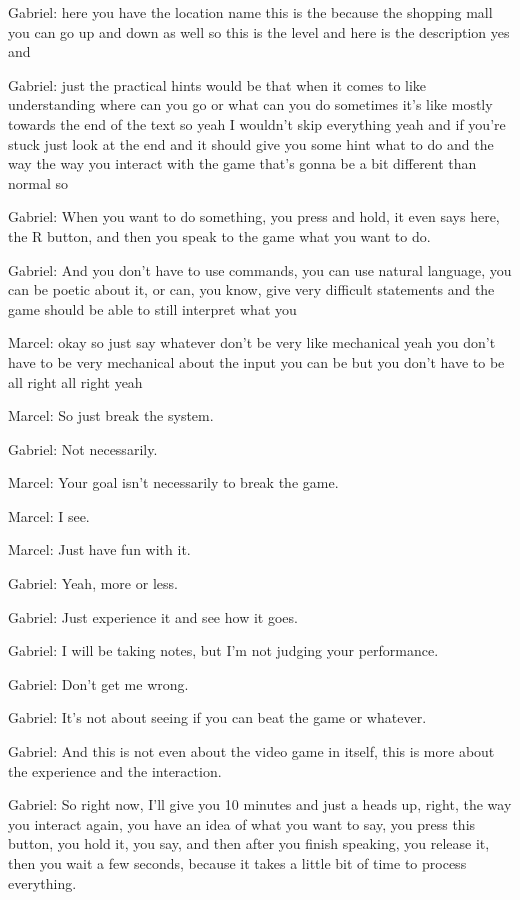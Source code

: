 Gabriel: here you have the location name this is the because the shopping mall you can go up and down as well so this is the level and here is the description yes and

Gabriel: just the practical hints would be that when it comes to like understanding where can you go or what can you do sometimes it's like mostly towards the end of the text so yeah I wouldn't skip everything yeah and if you're stuck just look at the end and it should give you some hint what to do and the way the way you interact with the game that's gonna be a bit different than normal so

Gabriel: When you want to do something, you press and hold, it even says here, the R button, and then you speak to the game what you want to do.

Gabriel: And you don't have to use commands, you can use natural language, you can be poetic about it, or can, you know, give very difficult statements and the game should be able to still interpret what you

Marcel: okay so just say whatever don't be very like mechanical yeah you don't have to be very mechanical about the input you can be but you don't have to be all right all right yeah

Marcel: So just break the system.

Gabriel: Not necessarily.

Marcel: Your goal isn't necessarily to break the game.

Marcel: I see.

Marcel: Just have fun with it.

Gabriel: Yeah, more or less.

Gabriel: Just experience it and see how it goes.

Gabriel: I will be taking notes, but I'm not judging your performance.

Gabriel: Don't get me wrong.

Gabriel: It's not about seeing if you can beat the game or whatever.

Gabriel: And this is not even about the video game in itself, this is more about the experience and the interaction.

Gabriel: So right now, I'll give you 10 minutes and just a heads up, right, the way you interact again, you have an idea of what you want to say, you press this button, you hold it, you say, and then after you finish speaking, you release it, then you wait a few seconds, because it takes a little bit of time to process everything.

